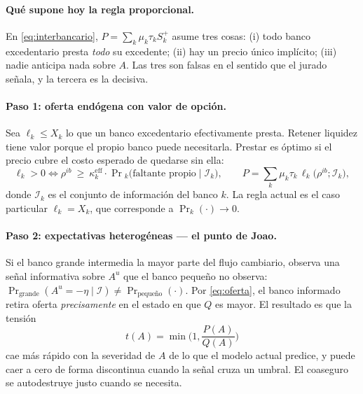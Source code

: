 \documentclass[11pt]{article}
\newcommand{\keff}{\kappa^{\mathrm{eff}}}
\theoremstyle{definition}
\begin{document}
\paragraph{Qu\'e supone hoy la regla proporcional.} En \eqref{eq:interbancario},
$P=\sum_k\mu_k\tau_k S^+_k$ asume tres cosas: (i) todo banco excedentario presta
\emph{todo} su excedente; (ii) hay un precio \'unico impl\'icito; (iii) nadie
anticipa nada sobre $A$. Las tres son falsas en el sentido que el jurado
se\~nala, y la tercera es la decisiva.

\paragraph{Paso 1: oferta end\'ogena con valor de opci\'on.} Sea $\ell_k\le X_k$ lo
que un banco excedentario efectivamente presta. Retener liquidez tiene valor
porque el propio banco puede necesitarla. Prestar es \'optimo si el precio cubre
el costo esperado de quedarse sin ella:
\begin{equation}
\ell_k>0 \iff \rho^{ib}\ \ge\ \keff_k\cdot\Pr{}_k\big(\text{faltante propio}\mid \mathcal{I}_k\big),
\qquad
P=\sum_k\mu_k\tau_k\,\ell_k\big(\rho^{ib};\mathcal{I}_k\big),
\label{eq:oferta}
\end{equation}
donde $\mathcal{I}_k$ es el conjunto de informaci\'on del banco $k$. La regla
actual es el caso particular $\ell_k=X_k$, que corresponde a
$\Pr_k(\cdot)\to0$.

\paragraph{Paso 2: expectativas heterog\'eneas --- el punto de Joao.} Si el banco
grande intermedia la mayor parte del flujo cambiario, observa una se\~nal
informativa sobre $A^u$ que el banco peque\~no no observa:
$\Pr_{\text{grande}}(A^u=-\eta\mid\mathcal{I})\neq\Pr_{\text{peque\~no}}(\cdot)$.
Por \eqref{eq:oferta}, el banco informado retira oferta \emph{precisamente} en
el estado en que $Q$ es mayor. El resultado es que la tensi\'on
\begin{equation}
t(A)=\min\!\Big(1,\frac{P(A)}{Q(A)}\Big)
\label{eq:tension}
\end{equation}
cae m\'as r\'apido con la severidad de $A$ de lo que el modelo actual predice, y
puede caer a cero de forma discontinua cuando la se\~nal cruza un umbral. El
coaseguro se autodestruye justo cuando se necesita.
\end{document}
